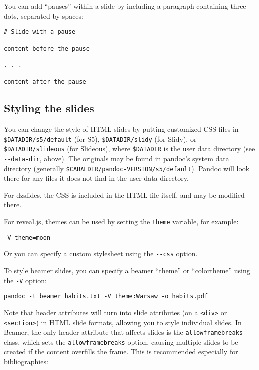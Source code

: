\documentclass[]{article}
\begin{document}
You can add ``pauses'' within a slide by including a paragraph
containing three dots, separated by spaces:

\begin{verbatim}
# Slide with a pause

content before the pause

. . .

content after the pause
\end{verbatim}

\subsection{Styling the slides}\label{styling-the-slides}

You can change the style of HTML slides by putting customized CSS files
in \texttt{\$DATADIR/s5/default} (for S5), \texttt{\$DATADIR/slidy} (for
Slidy), or \texttt{\$DATADIR/slideous} (for Slideous), where
\texttt{\$DATADIR} is the user data directory (see
\texttt{-{}-data-dir}, above). The originals may be found in pandoc's
system data directory (generally
\texttt{\$CABALDIR/pandoc-VERSION/s5/default}). Pandoc will look there
for any files it does not find in the user data directory.

For dzslides, the CSS is included in the HTML file itself, and may be
modified there.

For reveal.js, themes can be used by setting the \texttt{theme}
variable, for example:

\begin{verbatim}
-V theme=moon
\end{verbatim}

Or you can specify a custom stylesheet using the \texttt{-{}-css}
option.

To style beamer slides, you can specify a beamer ``theme'' or
``colortheme'' using the \texttt{-V} option:

\begin{verbatim}
pandoc -t beamer habits.txt -V theme:Warsaw -o habits.pdf
\end{verbatim}

Note that header attributes will turn into slide attributes (on a
\texttt{\textless{}div\textgreater{}} or
\texttt{\textless{}section\textgreater{}}) in HTML slide formats,
allowing you to style individual slides. In Beamer, the only header
attribute that affects slides is the \texttt{allowframebreaks} class,
which sets the \texttt{allowframebreaks} option, causing multiple slides
to be created if the content overfills the frame. This is recommended
especially for bibliographies:
\end{document}

